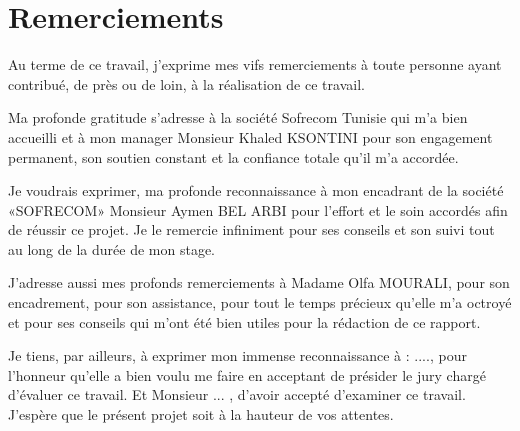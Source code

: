 \chapter*{\huge Remerciements}

\begin{center}
\it \Large

 
 Au terme de ce travail, j’exprime mes vifs remerciements à toute personne ayant contribué, de près ou de loin, à la réalisation de ce travail.

Ma profonde gratitude s’adresse à la société Sofrecom Tunisie qui m’a bien accueilli et à mon manager Monsieur Khaled KSONTINI pour son engagement permanent, son soutien constant et la confiance totale qu’il m’a accordée.

Je voudrais exprimer, ma profonde reconnaissance à mon encadrant de la société «SOFRECOM» Monsieur Aymen BEL ARBI pour l’effort et le soin accordés afin de réussir ce projet. Je le remercie infiniment pour ses conseils et son suivi tout au long de la durée de mon stage.

J’adresse aussi mes profonds remerciements à Madame Olfa MOURALI, pour son encadrement, pour son assistance, pour tout le temps précieux qu’elle m’a octroyé et pour ses conseils qui m’ont été bien utiles pour la rédaction de ce rapport.


Je tiens, par ailleurs, à exprimer mon immense reconnaissance à : ...., pour l’honneur qu’elle a bien voulu me faire en acceptant de présider le jury chargé d’évaluer ce travail. Et Monsieur ... , d’avoir accepté d’examiner ce travail. J’espère que le présent projet soit à la hauteur de vos attentes.

\end{center}